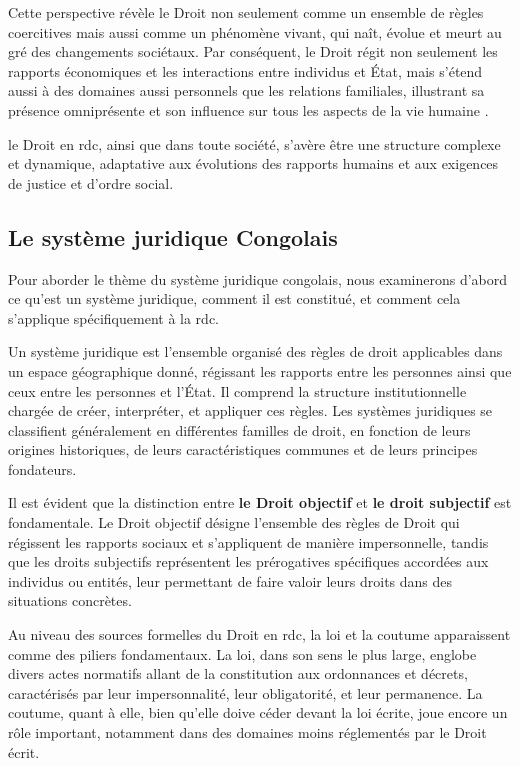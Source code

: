 Cette perspective révèle le Droit non seulement comme un ensemble de règles coercitives mais aussi comme un phénomène vivant, qui naît, évolue et meurt au gré des changements sociétaux. Par conséquent, le Droit régit non seulement les rapports économiques et les interactions entre individus et État, mais s'étend aussi à des domaines aussi personnels que les relations familiales, illustrant sa présence omniprésente et son influence sur tous les aspects de la vie humaine .

le Droit en \ac{rdc}, ainsi que dans toute société, s'avère être une structure complexe et dynamique, adaptative aux évolutions des rapports humains et aux exigences de justice et d'ordre social.

\subsection{Le système juridique Congolais}
Pour aborder le thème du système juridique congolais, nous examinerons d'abord ce qu'est un système juridique, comment il est constitué, et comment cela s'applique spécifiquement à la \acf{rdc}. 

Un système juridique est l'ensemble organisé des règles de droit applicables dans un espace géographique donné, régissant les rapports entre les personnes ainsi que ceux entre les personnes et l'État. Il comprend la structure institutionnelle chargée de créer, interpréter, et appliquer ces règles. Les systèmes juridiques se classifient généralement en différentes familles de droit, en fonction de leurs origines historiques, de leurs caractéristiques communes et de leurs principes fondateurs.

Il est évident que la distinction entre \textbf{le Droit objectif} et \textbf{le droit subjectif} est fondamentale. Le Droit objectif désigne l'ensemble des règles de Droit qui régissent les rapports sociaux et s'appliquent de manière impersonnelle, tandis que les droits subjectifs représentent les prérogatives spécifiques accordées aux individus ou entités, leur permettant de faire valoir leurs droits dans des situations concrètes.

Au niveau des sources formelles du Droit en \ac{rdc}, la loi et la coutume apparaissent comme des piliers fondamentaux. La loi, dans son sens le plus large, englobe divers actes normatifs allant de la constitution aux ordonnances et décrets, caractérisés par leur impersonnalité, leur obligatorité, et leur permanence. La coutume, quant à elle, bien qu'elle doive céder devant la loi écrite, joue encore un rôle important, notamment dans des domaines moins réglementés par le Droit écrit.

